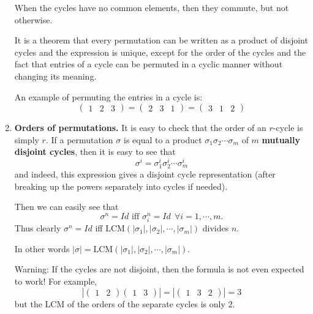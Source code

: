 \documentclass[12pt]{article}
\newcommand{\matr}[2]{\left( \begin{array}{*{#1}{r}}#2\end{array}\right)}
\begin{document}
\begin{enumerate}
When the cycles have no common elements, then they commute, but not
otherwise.

It is a theorem that every permutation can be written as a product of
disjoint cycles and the expression is unique, except for the order of
the cycles and the fact that entries of a cycle can be permuted in a
cyclic manner without changing its meaning.

An example of permuting the entries in a cycle is:
$$\matr{3}{1 & 2 & 3 } = \matr{3}{ 2 & 3 & 1 } = \matr{3}{3 & 1 & 2 }$$

\item {\bf Orders of permutations.}
It is easy to check that the order of an $r$-cycle is simply $r$.
If a permutation $\sigma$ is equal to a product $\sigma_1 \sigma_2
\cdots \sigma_m$ of $m$ {\bf mutually disjoint cycles}, then it is easy to see
that
$$\sigma^i = \sigma_1^i \sigma_2^i \cdots \sigma_m^i$$
and indeed, this expression gives a disjoint cycle representation
(after breaking up the powers separately into cycles if needed).

Then we can easily see that
$$\sigma^n = Id \mbox{ iff } \sigma_i^n = Id ~~\forall i=1,\cdots,m.$$
Thus clearly $\sigma^n=Id$ iff
$\mbox{LCM}(|\sigma_1|,|\sigma_2|,\cdots,|\sigma_m|)$ divides $n$.

In other words
$|\sigma|=\mbox{LCM}(|\sigma_1|,|\sigma_2|,\cdots,|\sigma_m|)$.

{Warning:} If the cycles are not disjoint, then the formula is not even
expected to work! 
For example,
$$|\matr{2}{1 & 2} \matr{2}{1 & 3}| = |\matr{3}{1 & 3 &  2}| = 3$$
but the LCM of the orders of the separate cycles is only $2$.
\end{enumerate}
\end{document}
